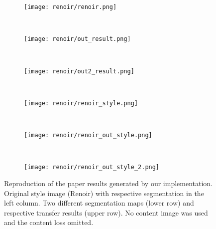 \begin{figure}
	\begin{subfigure}[t]{0.32\textwidth}
		\centering
		\texttt{[image: renoir/renoir.png]}
	\end{subfigure}%
	~
	\begin{subfigure}[t]{0.32\textwidth}
		\centering
		\texttt{[image: renoir/out\_result.png]}
	\end{subfigure}%
	~
	\begin{subfigure}[t]{0.32\textwidth}
		\centering
		\texttt{[image: renoir/out2\_result.png]}
	\end{subfigure}
	\\
	\begin{subfigure}[t]{0.32\textwidth}
		\centering
		\texttt{[image: renoir/renoir\_style.png]}
	\end{subfigure}%
	~
	\begin{subfigure}[t]{0.32\textwidth}
		\centering
		\texttt{[image: renoir/renoir\_out\_style.png]}
	\end{subfigure}%
	~
	\begin{subfigure}[t]{0.32\textwidth}
		\centering
		\texttt{[image: renoir/renoir\_out\_style\_2.png]}
	\end{subfigure}
	\caption[]{Reproduction of the paper results generated by our implementation. Original style image (Renoir) with respective segmentation in the left column. Two different segmentation maps (lower row) and respective transfer results (upper row). No content image was used and the content loss omitted.}
	\label{fig::nocontent}
\end{figure}
